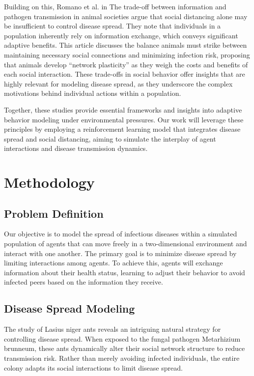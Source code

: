 \documentclass[9pt]{IEEEtran}
\begin{document}
Building on this, Romano et al. in The trade-off between information and pathogen transmission in animal societies \cite{romano2022tradeoff} argue that social distancing alone may be insufficient to control disease spread. They note that individuals in a population inherently rely on information exchange, which conveys significant adaptive benefits. This article discusses the balance animals must strike between maintaining necessary social connections and minimizing infection risk, proposing that animals develop “network plasticity” as they weigh the costs and benefits of each social interaction. These trade-offs in social behavior offer insights that are highly relevant for modeling disease spread, as they underscore the complex motivations behind individual actions within a population.

Together, these studies provide essential frameworks and insights into adaptive behavior modeling under environmental pressures. Our work will leverage these principles by employing a reinforcement learning model that integrates disease spread and social distancing, aiming to simulate the interplay of agent interactions and disease transmission dynamics.

\section{Methodology}

\subsection{Problem Definition}

Our objective is to model the spread of infectious diseases within a simulated population of agents that can move freely in a two-dimensional environment and interact with one another. The primary goal is to minimize disease spread by limiting interactions among agents. To achieve this, agents will exchange information about their health status, learning to adjust their behavior to avoid infected peers based on the information they receive.

\subsection{Disease Spread Modeling}

The study of Lasius niger ants \cite{Stroeymeyt2018} reveals an intriguing natural strategy for controlling disease spread. When exposed to the fungal pathogen Metarhizium brunneum, these ants dynamically alter their social network structure to reduce transmission risk. Rather than merely avoiding infected individuals, the entire colony adapts its social interactions to limit disease spread.
\end{document}
